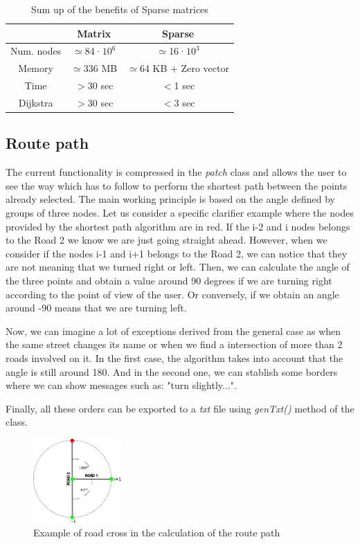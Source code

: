 \documentclass{article}
\begin{document}
\begin{table}[ht] 
\caption{Sum up of the benefits of Sparse matrices}
\centering
\begin{tabular}{c c c}
\hline\hline 
~ & Matrix & Sparse \\ [0.5ex]  
\hline 
Num. nodes & $\simeq$84·$10^{6}$ & $\simeq$16·$10^{3}$ \\
Memory & $\simeq$336 MB & $\simeq$64 KB + Zero vector\\ 
Time & $>$30 sec & $<$1 sec \\ 
Dijkstra &  $>$30 sec & $<$3 sec \\ [1ex]
\hline
\end{tabular} 
\label{table:nonlin}
\end{table} 

\subsection{Route path}
The current functionality is compressed in the \textit{patch} class and allows the user to see the way which has to follow to perform the shortest path between the points already selected.
The main working principle is based on the angle defined by groups of three nodes. Let us consider a specific clarifier example where the nodes provided by the shortest path algorithm are in red. If the i-2 and i nodes belongs to the Road 2 we know we are just going straight ahead. However, when we consider if the nodes i-1 and i+1 belongs to the Road 2, we can notice that they are not meaning that we turned right or left. Then, we can calculate the angle of the three points and obtain a value around 90 degrees if we are turning right according to the point of view of the user. Or conversely, if we obtain an angle around -90 means that we are turning left.

Now, we can imagine a lot of exceptions derived from the general case as when the same street changes its name or when we find a intersection of more than 2 roads involved on it. In the first case, the algorithm takes into account that the angle is still around 180. And in the second one, we can stablish some borders where we can show messages such as: "turn slightly...".

Finally, all these orders can be exported to a \textit{txt} file using \textit{genTxt()} method of the class.

\begin{figure}[h]
\centering
\includegraphics[width=0.3\textwidth]{angle.png}
\caption{Example of road cross in the calculation of the route path}
\end{figure}
\end{document}
